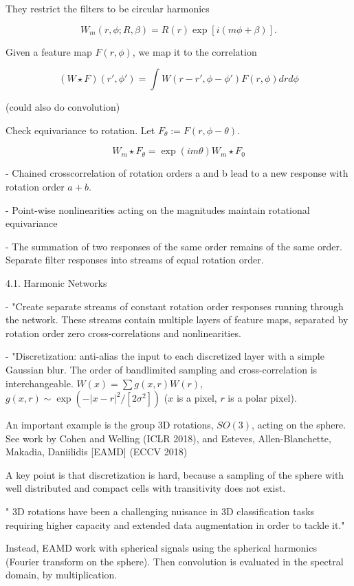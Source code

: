 \documentclass[english]{article}
\begin{document}
They restrict the filters to be circular harmonics

$$W_m(r,\phi;R,\beta)=R(r)\exp[i(m\phi+\beta)].$$

Given a feature map $F(r,\phi)$, we map it to the correlation 

$$(W \star F)(r',\phi') = \int W(r-r',\phi-\phi') F(r,\phi) drd\phi$$ 

(could also do convolution)

Check equivariance to rotation. Let $F_\theta :=F(r,\phi-\theta)$.

$$W_m \star F_\theta = \exp(im\theta) W_m \star F_0$$ 

- Chained crosscorrelation of rotation orders a and b lead to a new response
with rotation order $a + b$. 

- Point-wise nonlinearities acting on the magnitudes maintain rotational
equivariance

- The summation of two responses of the same order remains of the same order. Separate filter responses into
streams of equal rotation order.

4.1. Harmonic Networks

- "Create separate streams of constant rotation order responses running through the network. These streams contain multiple layers of feature maps, separated
by rotation order zero cross-correlations and nonlinearities.

- "Discretization: anti-alias the input to each discretized layer with a simple Gaussian blur. The order of bandlimited sampling and cross-correlation is interchangeable. $W(x) = \sum g(x,r) W(r)$, $g(x,r)\sim \exp(-|x-r|^2/[2\sigma^2])$ ($x$ is a pixel, $r$ is a polar pixel).

\item 
An important example is the group 3D rotations, $SO(3)$, acting on the sphere. See work by Cohen and Welling (ICLR 2018), and Esteves, Allen-Blanchette, Makadia, Daniilidis [EAMD] (ECCV 2018)

A key point is that discretization is hard, because a sampling of the sphere with well distributed and compact cells with transitivity does not exist. 

" 3D rotations have been a challenging nuisance in 3D classification tasks requiring higher capacity and extended
data augmentation in order to tackle it."


\item Instead, EAMD work with spherical signals using the spherical harmonics (Fourier transform on the sphere). Then convolution is evaluated in the spectral domain, by multiplication. 
\end{document}
